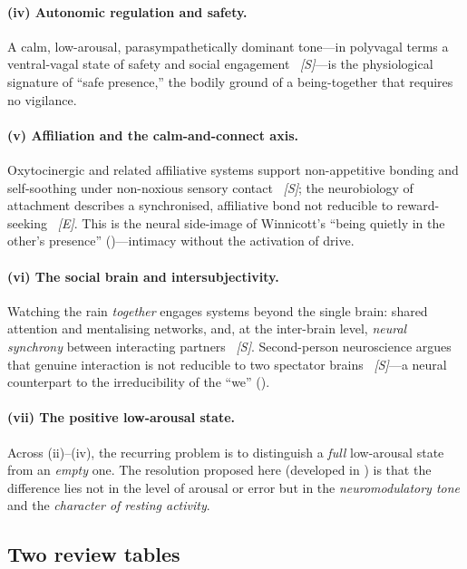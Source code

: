 \paragraph{(iv) Autonomic regulation and safety.} A calm, low-arousal, parasympathetically dominant tone---in polyvagal terms a ventral-vagal state of safety and social engagement \parencite{porges2007}~\emph{[S]}---is the physiological signature of ``safe presence,'' the bodily ground of a being-together that requires no vigilance.

\paragraph{(v) Affiliation and the calm-and-connect axis.} Oxytocinergic and related affiliative systems support non-appetitive bonding and self-soothing under non-noxious sensory contact \parencite{uvnasmoberg2015}~\emph{[S]}; the neurobiology of attachment describes a synchronised, affiliative bond not reducible to reward-seeking \parencite{feldman2017}~\emph{[E]}. This is the neural side-image of Winnicott's ``being quietly in the other's presence'' ()---intimacy without the activation of drive.

\paragraph{(vi) The social brain and intersubjectivity.} Watching the rain \emph{together} engages systems beyond the single brain: shared attention and mentalising networks, and, at the inter-brain level, \emph{neural synchrony} between interacting partners \parencite{hasson2012,dikker2017}~\emph{[S]}. Second-person neuroscience argues that genuine interaction is not reducible to two spectator brains \parencite{redcay2019}~\emph{[S]}---a neural counterpart to the irreducibility of the ``we'' ().

\paragraph{(vii) The positive low-arousal state.} Across (ii)--(iv), the recurring problem is to distinguish a \emph{full} low-arousal state from an \emph{empty} one. The resolution proposed here (developed in ) is that the difference lies not in the level of arousal or error but in the \emph{neuromodulatory tone} and the \emph{character of resting activity}.

\subsection{Two review tables}
\label{p19:sub:neuro-tables}

